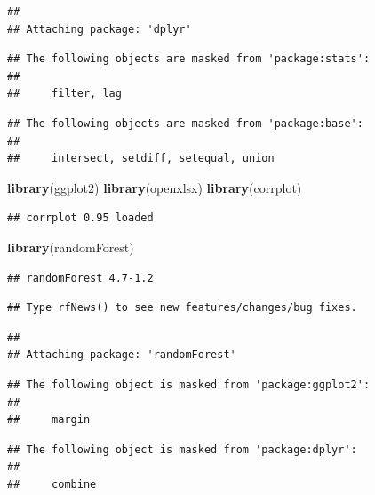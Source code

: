 \documentclass[
]{article}
\newenvironment{Shaded}{\begin{snugshade}}{\end{snugshade}}
\newcommand{\FunctionTok}[1]{\textcolor[rgb]{0.13,0.29,0.53}{\textbf{#1}}}
\newcommand{\NormalTok}[1]{#1}
\begin{document}
\begin{verbatim}
## 
## Attaching package: 'dplyr'
\end{verbatim}

\begin{verbatim}
## The following objects are masked from 'package:stats':
## 
##     filter, lag
\end{verbatim}

\begin{verbatim}
## The following objects are masked from 'package:base':
## 
##     intersect, setdiff, setequal, union
\end{verbatim}

\begin{Shaded}
\begin{Highlighting}[]
\FunctionTok{library}\NormalTok{(ggplot2)}
\FunctionTok{library}\NormalTok{(openxlsx)}
\FunctionTok{library}\NormalTok{(corrplot)}
\end{Highlighting}
\end{Shaded}

\begin{verbatim}
## corrplot 0.95 loaded
\end{verbatim}

\begin{Shaded}
\begin{Highlighting}[]
\FunctionTok{library}\NormalTok{(randomForest)}
\end{Highlighting}
\end{Shaded}

\begin{verbatim}
## randomForest 4.7-1.2
\end{verbatim}

\begin{verbatim}
## Type rfNews() to see new features/changes/bug fixes.
\end{verbatim}

\begin{verbatim}
## 
## Attaching package: 'randomForest'
\end{verbatim}

\begin{verbatim}
## The following object is masked from 'package:ggplot2':
## 
##     margin
\end{verbatim}

\begin{verbatim}
## The following object is masked from 'package:dplyr':
## 
##     combine
\end{verbatim}
\end{document}
